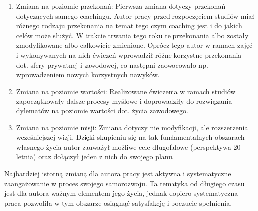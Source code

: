 \begin{enumerate}
  \item Zmiana na poziomie przekonań: Pierwsza zmiana dotyczy przekonań dotyczących samego coachingu. Autor pracy przed rozpoczęciem
      studiów miał różnego rodzaju przekonania na temat tego czym coaching jest i do jakich celów może służyć. W trakcie trwania
      tego roku te przekonania albo zostały zmodyfikowane albo całkowicie zmienione. Oprócz tego autor w ramach zajęć i wykonywanych
      na nich ćwiczeń wprowadził różne korzystne przekonania dot. sfery prywatnej i zawodowej, co następni zaowocowało np. wprowadzeniem nowych
      korzystnych nawyków.

  \item Zmiana na poziomie wartości: Realizowane ćwiczenia w ramach studiów zapoczątkowały dalsze procesy myślowe i doprowadziły do
      rozwiązania dylematów na poziomie wartości dot. życia zawodowego.

  \item Zmiana na poziomie misji: Zmiana dotyczy nie modyfikacji, ale rozszerzenia wcześniejszej wizji. Dzięki skupieniu się na tak fundamentalnych
      obszarach własnego życia autor zauważył możliwe cele długofalowe (perspektywa 20 letnia) oraz dołączył jeden z nich do swojego planu. 
\end{enumerate}

Najbardziej istotną zmianą dla autora pracy jest aktywna i systematyczne zaangażowanie w proces swojego samorozwoju. Ta tematyka
od długiego czasu jest dla autora ważnym elementem jego życia, jednak dopiero systematyczna praca pozwoliła w tym obszarze osiągnąć
satysfakcję i poczucie spełnienia.
